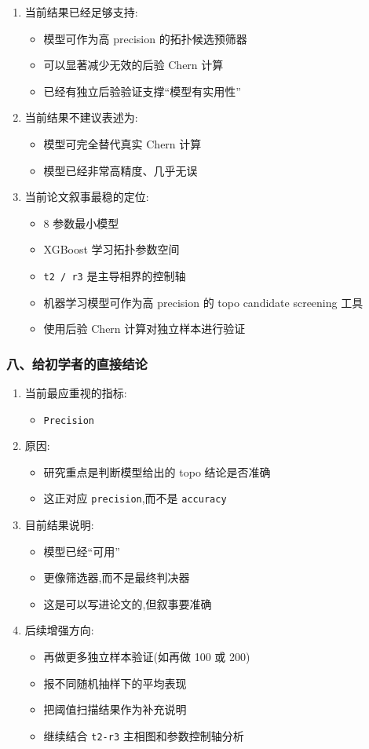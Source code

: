\documentclass[lang=cn,scheme=chinese,color=blue,device=normal,toc=onecol,math=cm]{elegantbook}
\begin{document}
\begin{enumerate}
\item 当前结果已经足够支持: 
\begin{itemize}
\item 模型可作为高 precision 的拓扑候选预筛器
\item 可以显著减少无效的后验 Chern 计算
\item 已经有独立后验验证支撑“模型有实用性”
\end{itemize}
\item 当前结果不建议表述为: 
\begin{itemize}
\item 模型可完全替代真实 Chern 计算
\item 模型已经非常高精度、几乎无误
\end{itemize}
\item 当前论文叙事最稳的定位: 
\begin{itemize}
\item 8 参数最小模型
\item XGBoost 学习拓扑参数空间
\item \texttt{t2 /\allowbreak{} r3} 是主导相界的控制轴
\item 机器学习模型可作为高 precision 的 topo candidate screening 工具
\item 使用后验 Chern 计算对独立样本进行验证
\end{itemize}
\end{enumerate}


\subsubsection{八、给初学者的直接结论}


\begin{enumerate}
\item 当前最应重视的指标: 
\begin{itemize}
\item \texttt{Precision}
\end{itemize}
\item 原因: 
\begin{itemize}
\item 研究重点是判断模型给出的 topo 结论是否准确
\item 这正对应 \texttt{precision},而不是 \texttt{accuracy}
\end{itemize}
\item 目前结果说明: 
\begin{itemize}
\item 模型已经“可用”
\item 更像筛选器,而不是最终判决器
\item 这是可以写进论文的,但叙事要准确
\end{itemize}
\item 后续增强方向: 
\begin{itemize}
\item 再做更多独立样本验证(如再做 100 或 200)
\item 报不同随机抽样下的平均表现
\item 把阈值扫描结果作为补充说明
\item 继续结合 \texttt{t2-r3} 主相图和参数控制轴分析
\end{itemize}
\end{enumerate}
\end{document}
